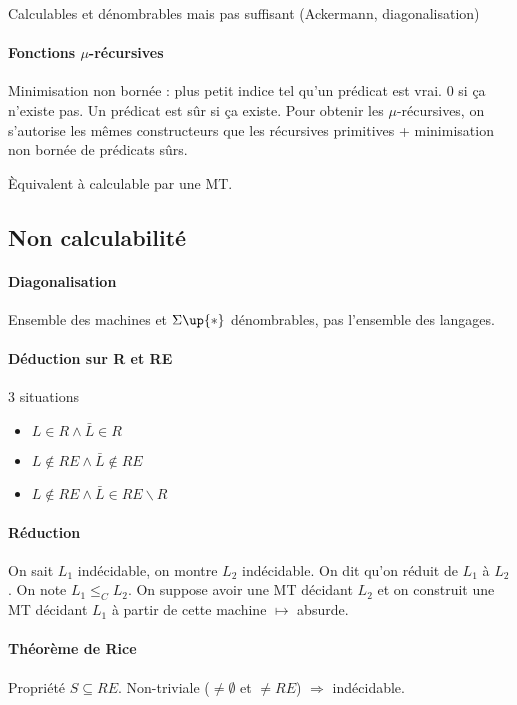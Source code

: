 \documentclass[french]{article}
\begin{document}
Calculables et dénombrables mais pas suffisant (Ackermann, diagonalisation)

\paragraph{Fonctions $\mu$-récursives}
Minimisation non bornée : plus petit indice tel qu'un prédicat est vrai. 0 si ça n'existe pas. Un prédicat est sûr si ça existe. Pour obtenir les $\mu$-récursives, on s'autorise les mêmes constructeurs que les récursives primitives + minimisation non bornée de prédicats sûrs.

Èquivalent à calculable par une MT.

\subsection{Non calculabilité}
\paragraph{Diagonalisation} Ensemble des machines et $\Sigma\up{*}$ dénombrables, pas l'ensemble des langages.

\paragraph{Déduction sur R et RE}
3 situations \begin{itemize}
\item $L\in R\wedge \bar{L}\in R$
\item $L\not\in RE\wedge\bar{L}\not\in RE$
\item $L\not\in RE\wedge\bar{L}\in RE\backslash R$
\end{itemize} 

\paragraph{Réduction}
On sait $L_1$ indécidable, on montre $L_2$ indécidable. On dit qu'on réduit de $L_1$ à $L_2$. On note $L_1\leq_C L_2$. On suppose avoir une MT décidant $L_2$ et on construit une MT décidant $L_1$ à partir de cette machine $\mapsto$ absurde.

\paragraph{Théorème de Rice}
Propriété $S\subseteq RE$. Non-triviale ($\neq\emptyset$ et $\neq RE$) $\Rightarrow$ indécidable.
\end{document}
